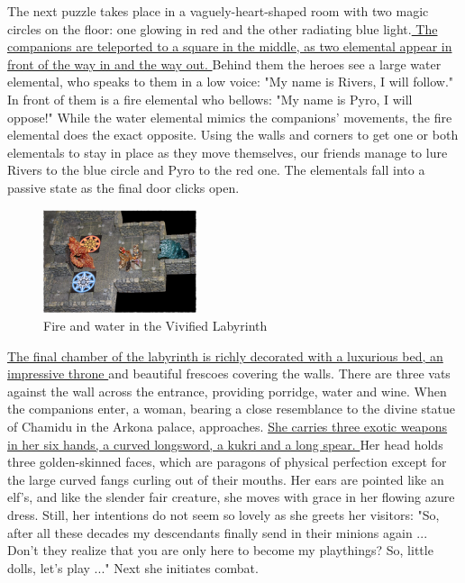 The next puzzle takes place in a vaguely-heart-shaped room with two magic circles on the floor: one glowing in red and the other radiating blue light.\hyperref[fig:Fire-and-water-in-the-Vivified-Labyrinth-565300388]{ The companions are teleported to a square in the middle, as two elemental appear in front of the way in and the way out. } Behind them the heroes see a large water elemental, who speaks to them in a low voice: "My name is Rivers, I will follow." In front of them is a fire elemental who bellows: "My name is Pyro, I will oppose!" While the water elemental mimics the companions' movements, the fire elemental does the exact opposite. Using the walls and corners to get one or both elementals to stay in place as they move themselves, our friends manage to lure Rivers to the blue circle and Pyro to the red one. The elementals fall into a passive state as the final door clicks open. \\

\begin{figure}[h]
	\centering
	\includegraphics[width=0.4\textwidth]{images/Fire-and-water-in-the-Vivified-Labyrinth-565300388_mod.jpg}
	\caption{Fire and water in the Vivified Labyrinth}
	\label{fig:Fire-and-water-in-the-Vivified-Labyrinth-565300388}
\end{figure}

\hyperref[fig:Vivified-labyrinth25-565301156]{ The final chamber of the labyrinth is richly decorated with a luxurious bed, an impressive throne } and beautiful frescoes covering the walls. There are three vats against the wall across the entrance, providing porridge, water and wine. When the companions enter, a woman, bearing a close resemblance to the divine statue of Chamidu in the Arkona palace, approaches. \hyperref[fig:Nerio-Arkona-s-treasure-565301563]{ She carries three exotic weapons in her six hands, a curved longsword, a kukri and a long spear. } Her head holds three golden-skinned faces, which are paragons of physical perfection except for the large curved fangs curling out of their mouths. Her ears are pointed like an elf's, and like the slender fair creature, she moves with grace in her flowing azure dress. Still, her intentions do not seem so lovely as she greets her visitors: "So, after all these decades my descendants finally send in their minions again ... Don't they realize that you are only here to become my playthings? So, little dolls, let's play ..." Next she initiates combat. \\

